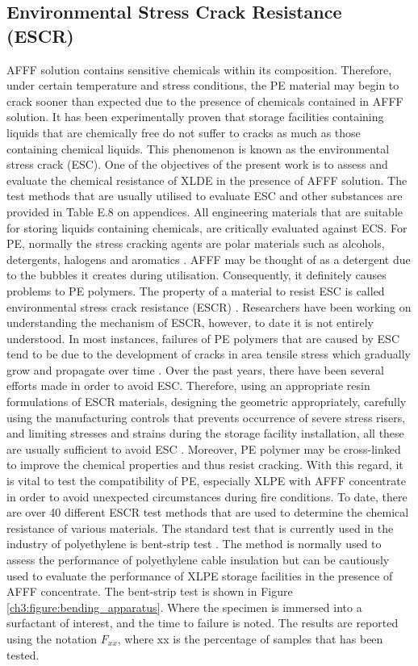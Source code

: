 \subsection{Environmental Stress Crack Resistance (ESCR)}
AFFF solution contains sensitive chemicals within its composition. Therefore, under certain temperature and stress conditions, the PE material may begin to crack sooner than expected due to the presence of chemicals contained in AFFF solution. It has been experimentally proven that storage facilities containing liquids that are chemically free do not suffer to cracks as much as those containing chemical liquids. This phenomenon is known as the environmental stress crack (ESC). One of the objectives of the present work is to assess and evaluate the chemical resistance of XLDE in the presence of AFFF solution. The test methods that are usually utilised to evaluate ESC and other substances are provided in Table E.8 on appendices. 
All engineering materials that are suitable for storing liquids containing chemicals, are critically evaluated against ECS. For PE, normally the stress cracking agents are polar materials such as alcohols, detergents, halogens and aromatics \cite{gabriel1998history}. AFFF may be thought of as a detergent due to the bubbles it creates during utilisation. Consequently, it definitely causes problems to PE polymers. The property of a material to resist ESC is called environmental stress crack resistance (ESCR) \cite{gabriel1998history}. Researchers have been working on understanding the mechanism of ESCR, however, to date it is not entirely understood. In most instances, failures of PE polymers that are caused by ESC tend to be due to the development of cracks in area tensile stress which gradually grow and propagate over time \cite{meola2005cross}. 
Over the past years, there have been several efforts made in order to avoid ESC. Therefore, using an appropriate resin formulations of ESCR materials, designing the geometric appropriately, carefully using the manufacturing controls that prevents occurrence of severe stress risers, and limiting stresses and strains during the storage facility installation, all these are usually sufficient to avoid ESC \cite{gabriel1998history}. Moreover, PE polymer may be cross-linked to improve the chemical properties and thus resist cracking.  With this regard, it is vital to test the compatibility of PE, especially XLPE with AFFF concentrate in order to avoid unexpected circumstances during fire conditions. To date, there are over 40 different ESCR test methods that are used to determine the chemical resistance of various materials. The standard test that is currently used in the industry of polyethylene is bent-strip test \cite{gabriel1998history}. The method is normally used to assess the performance of polyethylene cable insulation but can be cautiously used to evaluate the performance of XLPE storage facilities in the presence of AFFF concentrate. The bent-strip test is shown in Figure \ref{ch3:figure:bending_apparatus}. Where the specimen is immersed into a surfactant of interest, and the time to failure is noted. The results are reported using the notation $F_{xx}$, where xx is the percentage of samples that has been tested.
 
